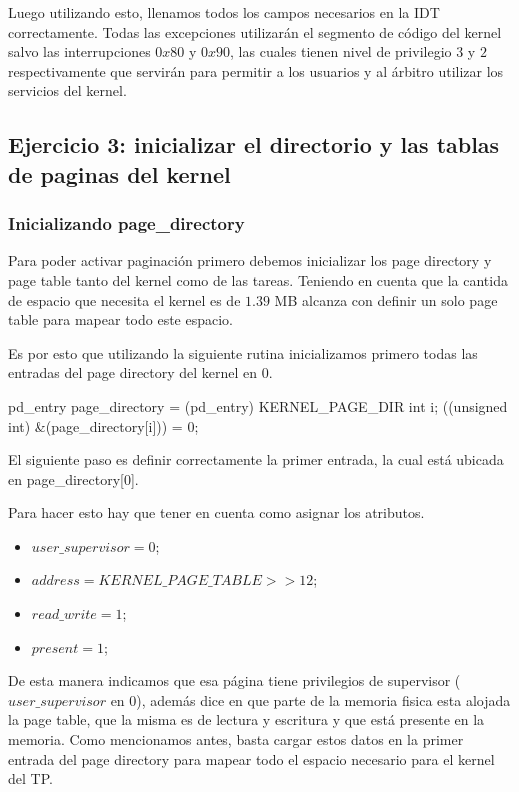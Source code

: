 \documentclass[a4paper,10pt,twoside]{article}
\newenvironment{pseudocodigo}
    {\vspace{0.5em} \begin{algorithmic}}
    {\end{algorithmic} \vspace{0.5em}}
\begin{document}
Luego utilizando esto, llenamos todos los campos necesarios en la IDT correctamente. Todas las excepciones utilizarán el segmento de código del kernel salvo las interrupciones $0x80$ y $0x90$, las cuales tienen nivel de privilegio $3$ y $2$ respectivamente que servirán para permitir a los usuarios y al árbitro utilizar los servicios del kernel.


\subsection{Ejercicio 3: inicializar el directorio y las tablas de paginas del kernel}
\subsubsection{Inicializando page\_directory}
Para poder activar paginación primero debemos inicializar los page directory y page table tanto del kernel como de las tareas. Teniendo en cuenta que la cantida de espacio que necesita el kernel es de $1.39$ MB alcanza con definir un solo page table para mapear todo este espacio.

Es por esto que utilizando la siguiente rutina inicializamos primero todas las entradas del page directory del kernel en $0$.

\begin{pseudocodigo}
  \STATE pd\_entry\* page\_directory = (pd\_entry\*) KERNEL\_PAGE\_DIR
  \STATE int i;
    \STATE \*((unsigned int\*) \&(page\_directory[i])) = 0;
  \ENDFOR
\end{pseudocodigo}

El siguiente paso es definir correctamente la primer entrada, la cual está ubicada en page\_directory[0].

Para hacer esto hay que tener en cuenta como asignar los atributos. 

\begin{itemize}
 \item $user\_supervisor = 0$;
 \item $address = KERNEL\_PAGE\_TABLE >> 12$;
 \item $read\_write = 1$;
 \item $present = 1$;
\end{itemize}

De esta manera indicamos que esa página tiene privilegios de supervisor ($user\_supervisor$ en 0), además dice en que parte de la memoria fisica esta alojada la page table, que la misma es de lectura y escritura y que está presente en la memoria.
Como mencionamos antes, basta cargar estos datos en la primer entrada del page directory para mapear todo el espacio necesario para el kernel del TP.\\
\end{document}
